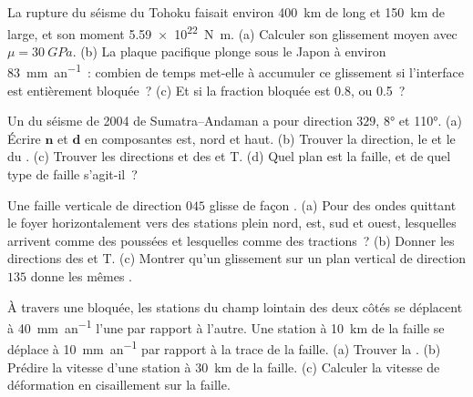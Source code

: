 \begin{exercise}[$\star\star$]\label{exo:b1:earthquake-source:6}
La rupture du séisme du Tohoku faisait environ \qty{400}{km} de long et
\qty{150}{km} de large, et son moment \qty{5.59e22}{N.m}. (a) Calculer son
glissement moyen avec $\mu = \qty{30}{GPa}$. (b) La plaque pacifique plonge sous
le Japon à environ \qty{83}{mm.an^{-1}}~: combien de temps met-elle à accumuler ce
glissement si l'interface est entièrement bloquée~? (c) Et si la fraction bloquée est 0.8,
ou 0.5~?
\end{exercise}

\begin{exercise}[$\star\star$]\label{exo:b1:earthquake-source:7}
Un  du séisme de 2004 de Sumatra--Andaman a pour direction $329$, 
\ang{8} et  \ang{110}. (a) Écrire $\mathbf n$ et $\mathbf d$ en composantes est, nord
et haut. (b) Trouver la direction, le  et le  du .
(c) Trouver les directions et  des  et T. (d) Quel plan est la
faille, et de quel type de faille s'agit-il~?
\end{exercise}

\begin{exercise}[$\star\star$]\label{exo:b1:earthquake-source:8}
Une faille verticale de direction $045$ glisse de façon . (a) Pour des ondes quittant le foyer
horizontalement vers des stations plein nord, est, sud et ouest, lesquelles arrivent comme des
poussées et lesquelles comme des tractions~? (b) Donner les directions des  et T. (c) Montrer
qu'un glissement  sur un plan vertical de direction $135$ donne les mêmes .
\end{exercise}

\begin{exercise}[$\star\star$]\label{exo:b1:earthquake-source:9}
À travers une  bloquée, les stations du champ lointain des deux côtés se déplacent
à \qty{40}{mm.an^{-1}} l'une par rapport à l'autre. Une station à \qty{10}{km} de la
faille se déplace à \qty{10}{mm.an^{-1}} par rapport à la trace de la faille. (a) Trouver la
. (b) Prédire la vitesse d'une station à \qty{30}{km} de la
faille. (c) Calculer la vitesse de déformation en cisaillement sur la faille.
\end{exercise}

